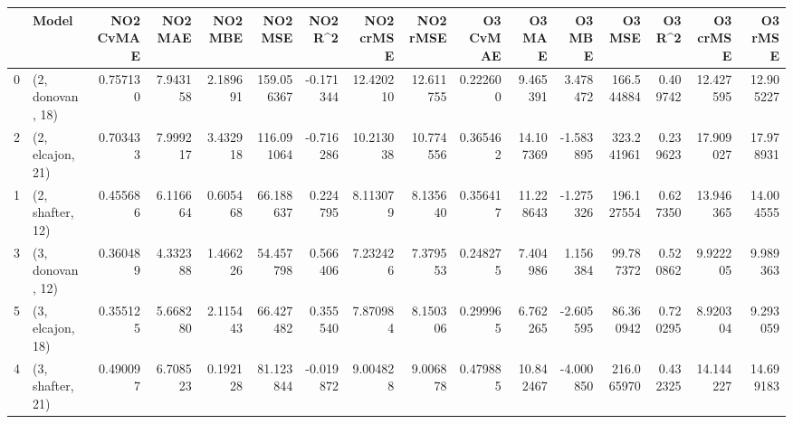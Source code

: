 \begin{tabular}{llrrrrrrrrrrrrrr}
\toprule
{} &             Model &  NO2 CvMAE &   NO2 MAE &   NO2 MBE &     NO2 MSE &   NO2 R\textasciicircum2 &  NO2 crMSE &   NO2 rMSE &  O3 CvMAE &     O3 MAE &    O3 MBE &      O3 MSE &    O3 R\textasciicircum2 &   O3 crMSE &    O3 rMSE \\
\midrule
0 &  (2, donovan, 18) &   0.757130 &  7.943158 &  2.189691 &  159.056367 & -0.171344 &  12.420210 &  12.611755 &  0.222600 &   9.465391 &  3.478472 &  166.544884 &  0.409742 &  12.427595 &  12.905227 \\
2 &  (2, elcajon, 21) &   0.703433 &  7.999217 &  3.432918 &  116.091064 & -0.716286 &  10.213038 &  10.774556 &  0.365462 &  14.107369 & -1.583895 &  323.241961 &  0.239623 &  17.909027 &  17.978931 \\
1 &  (2, shafter, 12) &   0.455686 &  6.116664 &  0.605468 &   66.188637 &  0.224795 &   8.113079 &   8.135640 &  0.356417 &  11.228643 & -1.275326 &  196.127554 &  0.627350 &  13.946365 &  14.004555 \\
3 &  (3, donovan, 12) &   0.360489 &  4.332388 &  1.466226 &   54.457798 &  0.566406 &   7.232426 &   7.379553 &  0.248275 &   7.404986 &  1.156384 &   99.787372 &  0.520862 &   9.922205 &   9.989363 \\
5 &  (3, elcajon, 18) &   0.355125 &  5.668280 &  2.115443 &   66.427482 &  0.355540 &   7.870984 &   8.150306 &  0.299965 &   6.762265 & -2.605595 &   86.360942 &  0.720295 &   8.920304 &   9.293059 \\
4 &  (3, shafter, 21) &   0.490097 &  6.708523 &  0.192128 &   81.123844 & -0.019872 &   9.004828 &   9.006878 &  0.479885 &  10.842467 & -4.000850 &  216.065970 &  0.432325 &  14.144227 &  14.699183 \\
\bottomrule
\end{tabular}

